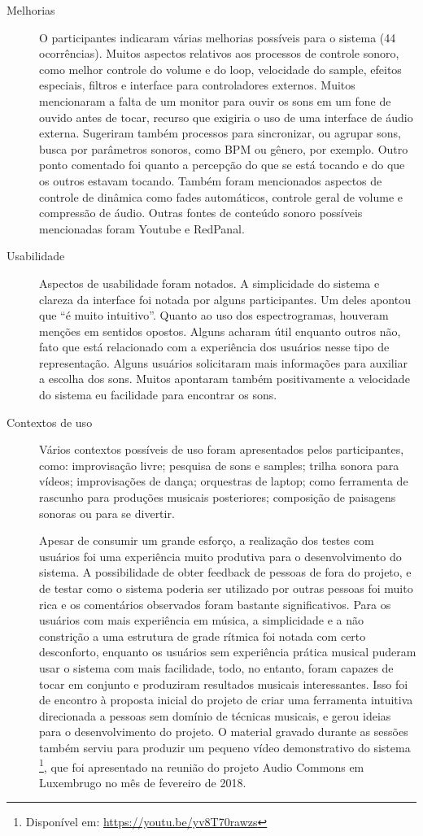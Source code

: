 \begin{description}
\item[Melhorias] O participantes indicaram várias melhorias possíveis para o sistema (44 ocorrências). Muitos aspectos relativos aos processos de controle sonoro, como melhor controle do volume e do loop, velocidade do sample, efeitos especiais, filtros e interface para controladores externos. Muitos mencionaram a falta de um monitor para ouvir os sons em um fone de ouvido antes de tocar, recurso que exigiria o uso de uma interface de áudio externa. Sugeriram também processos para sincronizar, ou agrupar sons, busca por parâmetros sonoros, como BPM ou gênero, por exemplo. Outro ponto comentado foi quanto a percepção do que se está tocando e do que os outros estavam tocando. Também foram mencionados aspectos de controle de dinâmica como fades automáticos, controle geral de volume e compressão de áudio. Outras fontes de conteúdo sonoro possíveis mencionadas foram Youtube e RedPanal.

\item[Usabilidade] Aspectos de usabilidade foram notados. A simplicidade do sistema e clareza da interface foi notada por alguns participantes. Um deles apontou que ``é muito intuitivo''. Quanto ao uso dos espectrogramas, houveram menções em sentidos opostos. Alguns acharam útil enquanto outros não, fato que está relacionado com a experiência dos usuários nesse tipo de representação. Alguns usuários solicitaram mais informações para auxiliar a escolha dos sons. Muitos apontaram também positivamente a velocidade do sistema eu facilidade para encontrar os sons.

\item[Contextos de uso] Vários contextos possíveis de uso foram apresentados pelos participantes, como: improvisação livre; pesquisa de sons e samples; trilha sonora para vídeos; improvisações de dança; orquestras de laptop; como ferramenta de rascunho para produções musicais posteriores; composição de paisagens sonoras ou para se divertir.

Apesar de consumir um grande esforço, a realização dos testes com usuários foi uma experiência muito produtiva para o desenvolvimento do sistema. A possibilidade de obter feedback de pessoas de fora do projeto, e de testar como o sistema poderia ser utilizado por outras pessoas foi muito rica e os comentários observados foram bastante significativos. Para os usuários com mais experiência em música, a simplicidade e a não constrição a uma estrutura de grade rítmica foi notada com certo desconforto, enquanto os usuários sem experiência prática musical puderam usar o sistema com mais facilidade, todo, no entanto, foram capazes de tocar em conjunto e produziram resultados musicais interessantes. Isso foi de encontro à proposta inicial do projeto de criar uma ferramenta intuitiva direcionada a pessoas sem domínio de técnicas musicais, e gerou ideias para o desenvolvimento do projeto. O material gravado durante as sessões também serviu para produzir um pequeno vídeo demonstrativo do sistema \footnote{Disponível em: \url{https://youtu.be/yv8T70rawzs}}, que foi apresentado na reunião do projeto Audio Commons em Luxembrugo no mês de fevereiro de 2018. 




\end{description}
